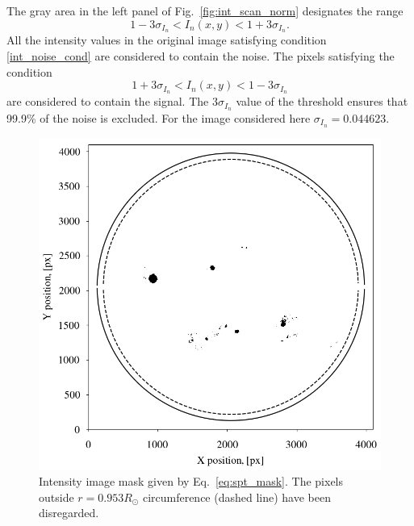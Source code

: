 \documentclass[paper=a4, fontsize=11pt]{article}
\numberwithin{equation}{section}
\numberwithin{figure}{section}
\numberwithin{table}{section}
\begin{document}
The gray area in the left panel of Fig.~\ref{fig:int_scan_norm} designates the range
\begin{equation}\label{int_noise_cond}
1 - 3\sigma_{I_n} < I_n(x, y) < 1 + 3\sigma_{I_n}.
\end{equation}
All the intensity values in the original image satisfying condition \eqref{int_noise_cond} are considered to contain the noise.
The pixels satisfying the condition
\begin{equation}\label{signal_cond}
1 + 3\sigma_{I_n} < I_n(x, y) < 1 - 3\sigma_{I_n}
\end{equation}
are considered to contain the signal.
The $3\sigma_{I_n}$ value of the threshold ensures that 99.9\% of the noise is excluded.
For the image considered here $\sigma_{I_n} = 0.044623$.
\begin{figure}[h!]
\centering
\includegraphics[scale = 0.735]{spt_mask}
\caption[]{Intensity image mask given by Eq.~\eqref{eq:spt_mask}.
           The pixels outside $r = 0.953R_\odot$ circumference (dashed line) have been disregarded.}
\label{fig:spt_mask}
\end{figure}
\end{document}
